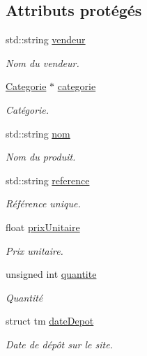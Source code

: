 \subsection*{Attributs protégés}
\begin{DoxyCompactItemize}
\item 
std\-::string \hyperlink{class_produit_a176eb59190cd9b761814fd5c68a8353b}{vendeur}
\begin{DoxyCompactList}\small\item\em Nom du vendeur. \end{DoxyCompactList}\item 
\hyperlink{class_categorie}{Categorie} $\ast$ \hyperlink{class_produit_a27756eb9e95c2a37dad2f73c3c3fa2e3}{categorie}
\begin{DoxyCompactList}\small\item\em Catégorie. \end{DoxyCompactList}\item 
std\-::string \hyperlink{class_produit_acb895352487797b4b9189b8fde1f8c58}{nom}
\begin{DoxyCompactList}\small\item\em Nom du produit. \end{DoxyCompactList}\item 
std\-::string \hyperlink{class_produit_a373d0a18812023e675ae981ca9618209}{reference}
\begin{DoxyCompactList}\small\item\em Référence unique. \end{DoxyCompactList}\item 
float \hyperlink{class_produit_ac4432cc25a56757fce7300232046243a}{prix\-Unitaire}
\begin{DoxyCompactList}\small\item\em Prix unitaire. \end{DoxyCompactList}\item 
unsigned int \hyperlink{class_produit_a6c569e4c47aed9ee050bb0aa9455dd62}{quantite}
\begin{DoxyCompactList}\small\item\em Quantité \end{DoxyCompactList}\item 
struct tm \hyperlink{class_produit_ad1e7e307209f7ef6ad7cf407801fb5e6}{date\-Depot}
\begin{DoxyCompactList}\small\item\em Date de dépôt sur le site. \end{DoxyCompactList}\item 

\end{DoxyCompactItemize}
